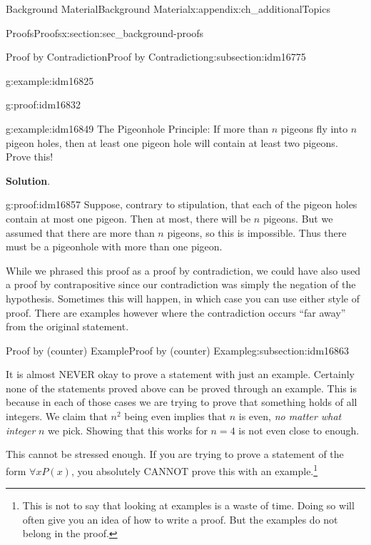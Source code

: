 \documentclass[oneside,10pt,]{book}
\numberwithin{equation}{chapter}
\begin{document}
\begin{appendixptx}{Background Material}{}{Background Material}{}{}{x:appendix:ch_additionalTopics}
\begin{sectionptx}{Proofs}{}{Proofs}{}{}{x:section:sec_background-proofs}
\begin{subsectionptx}{Proof by Contradiction}{}{Proof by Contradiction}{}{}{g:subsection:idm16775}
\begin{example}{}{g:example:idm16825}
\begin{proofptx}{}{g:proof:idm16832}
\end{proofptx}
\end{example}
\begin{example}{}{g:example:idm16849}%
The Pigeonhole Principle: If more than \(n\) pigeons fly into \(n\) pigeon holes, then at least one pigeon hole will contain at least two pigeons. Prove this!%
\par\smallskip%
\noindent\textbf{Solution}.\hypertarget{g:solution:idm16856}{}\quad{}\begin{proofptx}{}{g:proof:idm16857}
Suppose, contrary to stipulation, that each of the pigeon holes contain at most one pigeon. Then at most, there will be \(n\) pigeons. But we assumed that there are more than \(n\) pigeons, so this is impossible. Thus there must be a pigeonhole with more than one pigeon.%
\end{proofptx}
While we phrased this proof as a proof by contradiction, we could have also used a proof by contrapositive since our contradiction was simply the negation of the hypothesis. Sometimes this will happen, in which case you can use either style of proof. There are examples however where the contradiction occurs ``far away'' from the original statement.%
\end{example}
\end{subsectionptx}
%
%
\typeout{************************************************}
\typeout{************************************************}
%
\begin{subsectionptx}{Proof by (counter) Example}{}{Proof by (counter) Example}{}{}{g:subsection:idm16863}
%
\par
It is almost NEVER okay to prove a statement with just an example. Certainly none of the statements proved above can be proved through an example. This is because in each of those cases we are trying to prove that something holds of all integers. We claim that \(n^2\) being even implies that \(n\) is even, \emph{no matter what integer} \(n\) we pick. Showing that this works for \(n = 4\) is not even close to enough.%
\par
This cannot be stressed enough. If you are trying to prove a statement of the form \(\forall x P(x)\), you absolutely CANNOT prove this with an example.\footnote{This is not to say that looking at examples is a waste of time. Doing so will often give you an idea of how to write a proof. But the examples do not belong in the proof.\label{g:fn:idm16877}}%
\par

\end{subsectionptx}
\end{sectionptx}
\end{appendixptx}
\end{document}
